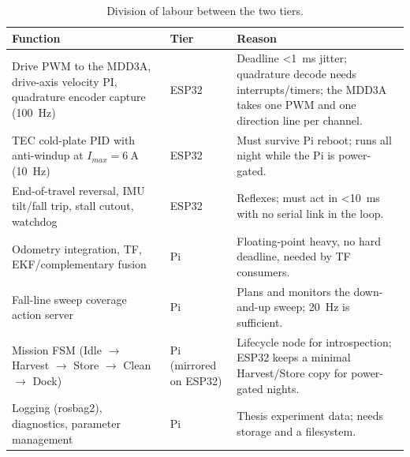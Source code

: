 \documentclass[11pt,a4paper]{article}
\begin{document}
\begin{table}[htb]
\centering\small
\caption{Division of labour between the two tiers.}
\label{tab:division}
\begin{tabularx}{\textwidth}{@{}L{4.6cm}L{2.2cm}X@{}}
\toprule
\textbf{Function} & \textbf{Tier} & \textbf{Reason} \\
\midrule
Drive PWM to the MDD3A, drive-axis velocity PI, quadrature encoder capture (\SI{100}{\hertz}) & ESP32 & Deadline \SI{<1}{\milli\second} jitter; quadrature decode needs interrupts/timers; the MDD3A takes one PWM and one direction line per channel. \\
TEC cold-plate PID with anti-windup at $I_{max}=\SI{6}{\ampere}$ (\SI{10}{\hertz}) & ESP32 & Must survive Pi reboot; runs all night while the Pi is power-gated. \\
End-of-travel reversal, IMU tilt/fall trip, stall cutout, watchdog & ESP32 & Reflexes; must act in \SI{<10}{\milli\second} with no serial link in the loop. \\
Odometry integration, TF, EKF/complementary fusion & Pi & Floating-point heavy, no hard deadline, needed by TF consumers. \\
Fall-line sweep coverage action server & Pi & Plans and monitors the down-and-up sweep; \SI{20}{\hertz} is sufficient. \\
Mission FSM (Idle $\to$ Harvest $\to$ Store $\to$ Clean $\to$ Dock) & Pi (mirrored on ESP32) & Lifecycle node for introspection; ESP32 keeps a minimal Harvest/Store copy for power-gated nights. \\
Logging (rosbag2), diagnostics, parameter management & Pi & Thesis experiment data; needs storage and a filesystem. \\
\bottomrule
\end{tabularx}
\end{table}
\end{document}
